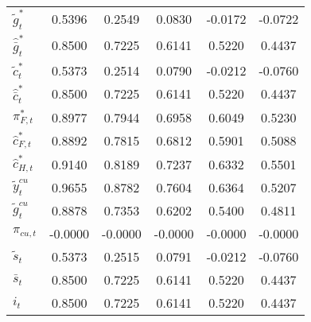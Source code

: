 \begin{center}
\begin{longtable}{lccccc}
${\tilde g_t^*}       $	 & 	     0.5396	 & 	     0.2549	 & 	     0.0830	 & 	    -0.0172	 & 	    -0.0722 \\ 
${\hat {\bar g}_t^*}  $	 & 	     0.8500	 & 	     0.7225	 & 	     0.6141	 & 	     0.5220	 & 	     0.4437 \\ 
${\tilde c_t^*}       $	 & 	     0.5373	 & 	     0.2514	 & 	     0.0790	 & 	    -0.0212	 & 	    -0.0760 \\ 
${\hat {\bar c}_t^*}  $	 & 	     0.8500	 & 	     0.7225	 & 	     0.6141	 & 	     0.5220	 & 	     0.4437 \\ 
${\pi_{F,t}^*}        $	 & 	     0.8977	 & 	     0.7944	 & 	     0.6958	 & 	     0.6049	 & 	     0.5230 \\ 
${\hat c_{F,t}^*}     $	 & 	     0.8892	 & 	     0.7815	 & 	     0.6812	 & 	     0.5901	 & 	     0.5088 \\ 
${\hat c_{H,t}^*}     $	 & 	     0.9140	 & 	     0.8189	 & 	     0.7237	 & 	     0.6332	 & 	     0.5501 \\ 
${\tilde y_t^{cu}}    $	 & 	     0.9655	 & 	     0.8782	 & 	     0.7604	 & 	     0.6364	 & 	     0.5207 \\ 
${\tilde g_t^{cu}}    $	 & 	     0.8878	 & 	     0.7353	 & 	     0.6202	 & 	     0.5400	 & 	     0.4811 \\ 
${\pi_{cu,t}}         $	 & 	    -0.0000	 & 	    -0.0000	 & 	    -0.0000	 & 	    -0.0000	 & 	    -0.0000 \\ 
${\tilde s_t}         $	 & 	     0.5373	 & 	     0.2515	 & 	     0.0791	 & 	    -0.0212	 & 	    -0.0760 \\ 
${\bar s_t}           $	 & 	     0.8500	 & 	     0.7225	 & 	     0.6141	 & 	     0.5220	 & 	     0.4437 \\ 
${i_t}                $	 & 	     0.8500	 & 	     0.7225	 & 	     0.6141	 & 	     0.5220	 & 	     0.4437 \\ 
\end{longtable}
 \end{center}
